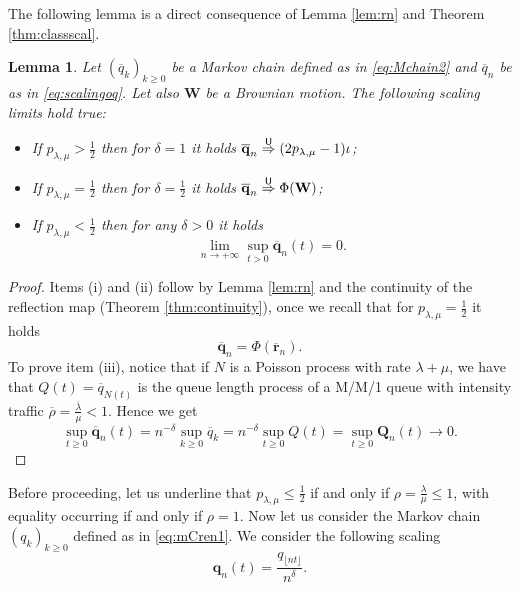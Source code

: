 \documentclass[]{amsart}
\numberwithin{equation}{section}
\newtheorem{lem}[thm]{Lemma}
\theoremstyle{remark}
\theoremstyle{definition}
\begin{document}
The following lemma is a direct consequence of Lemma \ref{lem:rn} and Theorem \ref{thm:classscal}.
\begin{lem}\label{lem:ovqk}
	Let $(\overline{q}_k)_{k \ge 0}$ be a Markov chain defined as in \eqref{eq:Mchain2} and $\overline{q}_n$ be as in \eqref{eq:scalingoq}. Let also $\mathbf{W}$ be a Brownian motion. The following scaling limits hold true:
	\begin{itemize}
		\item[(i)] If $p_{\lambda,\mu}>\frac{1}{2}$ then for $\delta=1$ it holds $\overline{\mathbf{q}}_n \overset{\sf U}{\Rightarrow} (2p_{\lambda,\mu}-1)\iota$;
		\item[(ii)] If $p_{\lambda,\mu}=\frac{1}{2}$ then for $\delta=\frac{1}{2}$ it holds $\overline{\mathbf{q}}_n\overset{\sf U}{\Rightarrow}\Phi(\mathbf{W})$;
		\item[(iii)] If $p_{\lambda,\mu}<\frac{1}{2}$ then for any $\delta>0$ it holds
		\begin{equation*}
			\lim_{n \to +\infty}\sup_{t>0}\mathbf{\overline{q}}_n(t)=0.
		\end{equation*}
	\end{itemize}
\end{lem}
\begin{proof}
	Items (i) and (ii) follow by Lemma \ref{lem:rn} and the continuity of the reflection map (Theorem \ref{thm:continuity}), once we recall that for $p_{\lambda,\mu}=\frac{1}{2}$ it holds
	\begin{equation*}
		\overline{\mathbf{q}}_n=\Phi(\overline{\mathbf{r}}_n).
	\end{equation*}
	To prove item (iii), notice that if $N$ is a Poisson process with rate $\lambda+\mu$, we have that $Q(t)=\overline{q}_{N(t)}$ is the queue length process of a M/M/1 queue with intensity traffic $\overline{\rho}=\frac{\overline{\lambda}}{\mu}<1$. Hence we get
	\begin{equation*}
		\sup_{t \ge 0}\overline{\mathbf{q}}_n(t)=n^{-\delta}\sup_{k \ge 0}\overline{q}_k=n^{-\delta}\sup_{t \ge 0}Q(t)=\sup_{t \ge 0}\mathbf{Q}_n(t) \to 0.
	\end{equation*} 
\end{proof}
Before proceeding, let us underline that $p_{\lambda,\mu} \le \frac{1}{2}$ if and only if $\rho=\frac{\lambda}{\mu} \le 1$, with equality occurring if and only if $\rho=1$. Now let us consider the Markov chain $(q_k)_{k \ge 0}$ defined as in \eqref{eq:mCren1}. We consider the following scaling
\begin{equation}\label{eq:scalingqn}
	\mathbf{q}_n(t)=\frac{q_{\lfloor nt \rfloor}}{n^\delta}.
\end{equation}
\end{document}

